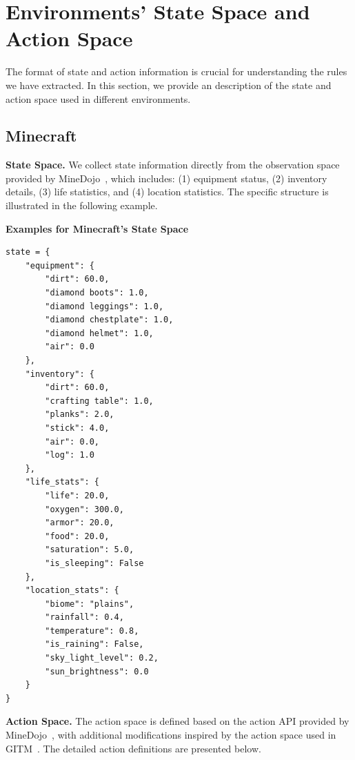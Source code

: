\documentclass{article} %
\begin{document}
\section{Environments' State Space and Action Space}
\label{sec: Environments' State Space and Action Space}

The format of state and action information is crucial for understanding the rules we have extracted. In this section, we provide an description of the state and action space used in different environments.

\subsection{Minecraft}

\textbf{State Space.} We collect state information directly from the observation space provided by MineDojo~\citep{fan2022minedojo}, which includes: (1) equipment status, (2) inventory details, (3) life statistics, and (4) location statistics. The specific structure is illustrated in the following example.


\begin{center}
    \textbf{Examples for Minecraft's State Space}
\end{center}
\lstset{language=}
\begin{lstlisting}
state = {
    "equipment": {
        "dirt": 60.0,
        "diamond boots": 1.0,
        "diamond leggings": 1.0,
        "diamond chestplate": 1.0,
        "diamond helmet": 1.0,
        "air": 0.0
    },
    "inventory": {
        "dirt": 60.0,
        "crafting table": 1.0,
        "planks": 2.0,
        "stick": 4.0,
        "air": 0.0,
        "log": 1.0
    },
    "life_stats": {
        "life": 20.0,
        "oxygen": 300.0,
        "armor": 20.0,
        "food": 20.0,
        "saturation": 5.0,
        "is_sleeping": False
    },
    "location_stats": {
        "biome": "plains",
        "rainfall": 0.4,
        "temperature": 0.8,
        "is_raining": False,
        "sky_light_level": 0.2,
        "sun_brightness": 0.0
    }
}
\end{lstlisting}


\textbf{Action Space.} The action space is defined based on the action API provided by MineDojo~\citep{fan2022minedojo}, with additional modifications inspired by the action space used in GITM~\citep{zhu2023ghost}. The detailed action definitions are presented below.
\end{document}
